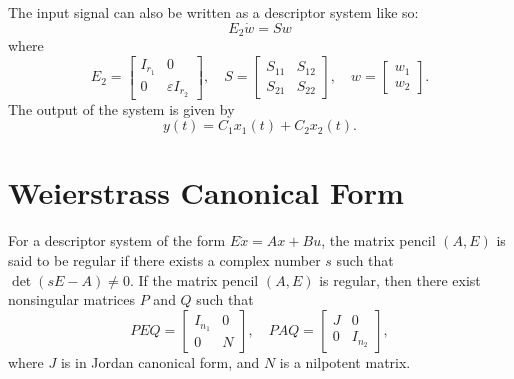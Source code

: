 \documentclass{article}
\begin{document}
The input signal can also be written as a descriptor system like so:
\begin{equation}
    E_2 \dot{w} = S w
\end{equation}
where
\begin{equation}
    E_2 = \begin{bmatrix}
    I_{r_1} & 0 \\
    0 & \varepsilon I_{r_2}
    \end{bmatrix}, \quad
    S = \begin{bmatrix}
    S_{11} & S_{12} \\
    S_{21} & S_{22}
    \end{bmatrix}, \quad
    w = \begin{bmatrix}
    w_1 \\
    w_2
    \end{bmatrix}.
\end{equation}
The output of the system is given by
\begin{equation}
    y(t) = C_1 x_1(t) + C_2 x_2(t).
\end{equation}

\section{Weierstrass Canonical Form}
\label{sec:weierstrass-canonical-form}
For a descriptor system of the form \(E \dot{x} = A x + B u\), the matrix pencil \((A, E)\)
is said to be regular
if there exists a complex number \(s\) such that \(\det(sE - A) \neq 0\).
If the matrix pencil \((A, E)\) is regular, then there exist nonsingular
matrices \(P\) and \(Q\) such that
\begin{equation}
P E Q = \begin{bmatrix}
I_{n_1} & 0 \\
0 & N
\end{bmatrix}, \quad
P A Q = \begin{bmatrix}
J & 0 \\
0 & I_{n_2}
\end{bmatrix},
\end{equation}
where \(J\) is in Jordan canonical form, and \(N\) is a nilpotent matrix. 
\end{document}
